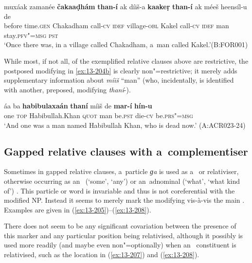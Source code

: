 \begin{exe}
\ex
\label{ex:13-204}
\gll muxáak zamanée \textbf{čakaaḍhám} \textbf{than-í} ak díiš-a \textbf{kaakeṛ} \textbf{than-í} ak méeš heensíl-u de\\
before time.\textsc{gen} Chakadham call-\textsc{cv} \textsc{idef} village-\textsc{obl}  Kakel call-\textsc{cv} \textsc{idef} man stay.\textsc{pfv"=msg} \textsc{pst}\\
\glt `Once there was, in a village called Chakadham, a~man called Kakel.'\newline (B:FOR001)
\end{exe}


While most, if not all, of the exemplified relative clauses above are restrictive, the postposed modifying   in \ref{ex:13-204b} is clearly non"=restrictive; it merely adds supplementary information about \textit{míiš} ``man'' (who, incidentally, is identified with another, preposed, modifying \textit
{thaní}-). 

\begin{exe}
\ex
\label{ex:13-204b}
\gll áa ba \textbf{habibulaxaán} \textbf{thaní} míiš de \textbf{mar-í} \textbf{hín-u}\\
one \textsc{top} Habibullah.Khan \textsc{quot} man be.\textsc{pst}   die-\textsc{cv} be.\textsc{prs"=msg}\\
\glt `And one was a man named Habibullah Khan, who is dead now.' \newline(A:ACR023-24)
\end{exe}



\subsection{Gapped relative clauses with a~complementiser}
\label{subsec:13-6-4}


Sometimes in gapped relative clauses, a~particle \textit{ɡa} is used as a~ or relativiser, otherwise occurring as an~ (`some', `any') or an~adnominal  (`what', `what kind of') . This particle or word is invariable and thus is not coreferential with the modified NP. Instead it seems to merely mark the modifying  vis-à-vis the main . Examples are given in (\ref{ex:13-205})--(\ref{ex:13-208}).


There does not seem to be any significant covariation between the presence of this marker and any particular position being relativised, although it possibly is used more readily (and maybe even non"=optionally) when an~ constituent is relativised, such as the location in (\ref{ex:13-207}) and (\ref{ex:13-208}). 

